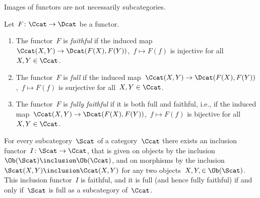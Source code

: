 \begin{warning*}
  Images of functors are not necessarily subcategories.
\end{warning*}


\begin{definition}[label=properties of functors]
  Let~$F \colon \Ccat \to \Dcat$ be a functor.
  \begin{enumerate}
    \item
      The functor~$F$ is \emph{faithful} if the induced map~$\Ccat(X,Y) \to \Dcat(F(X),F(Y))$,~$f \mapsto F(f)$ is injective for all~$X, Y \in \Ccat$.
    \item
      The functor~$F$ is \emph{full} if the induced map~$\Ccat(X,Y) \to \Dcat(F(X),F(Y))$,~$f \mapsto F(f)$ is surjective for all~$X, Y \in \Ccat$.
    \item
      The functor~$F$ is \emph{fully faithful} if it is both full and faithful, i.e., if the induced map~$\Ccat(X,Y) \to \Dcat(F(X),F(Y))$,~$f \mapsto F(f)$ is bijective for all~$X, Y \in \Ccat$.
  \end{enumerate}
\end{definition}


\begin{example*}
  For every subcategory~$\Scat$ of a category~$\Ccat$ there exists an inclusion functor~$I \colon \Scat \to \Ccat$, that is given on objects by the inclusion~$\Ob(\Scat) \inclusion \Ob(\Ccat)$, and on morphisms by the inclusion~$\Scat(X,Y) \inclusion \Ccat(X,Y)$ for any two objects~$X, Y, \in \Ob(\Scat)$.
  This inclusion functor~$I$ is faithful, and it is full (and hence fully faithful) if and only if~$\Scat$ is full as a subcategory of~$\Ccat$.
\end{example*}




